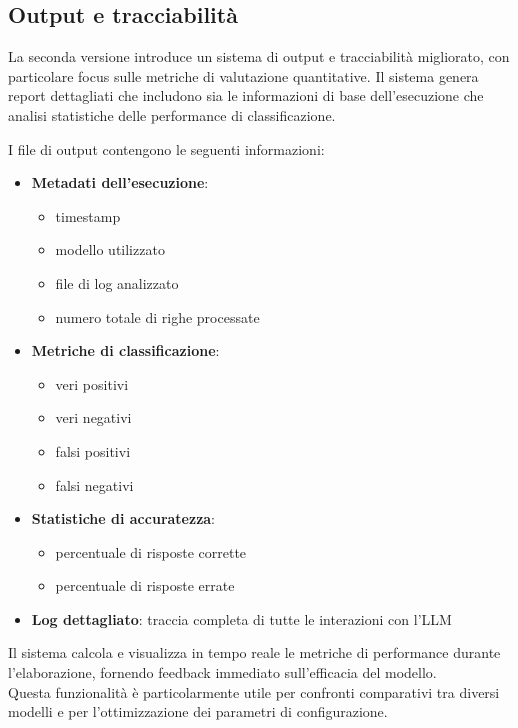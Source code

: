 \documentclass[12pt]{report}
\begin{document}
\subsection{Output e tracciabilità}
\label{subsec:ver2_output}

La seconda versione introduce un sistema di output e tracciabilità migliorato, con particolare focus sulle metriche di valutazione quantitative. Il sistema genera report dettagliati che includono sia le informazioni di base dell'esecuzione che analisi statistiche delle performance di classificazione.

I file di output contengono le seguenti informazioni:
\begin{itemize}
    \item \textbf{Metadati dell'esecuzione}:
          \begin{itemize}
              \item timestamp
              \item modello utilizzato
              \item file di log analizzato
              \item numero totale di righe processate
          \end{itemize}
    \item \textbf{Metriche di classificazione}:
          \begin{itemize}
              \item veri positivi
              \item veri negativi
              \item falsi positivi
              \item falsi negativi
          \end{itemize}
    \item \textbf{Statistiche di accuratezza}:
          \begin{itemize}
              \item percentuale di risposte corrette
              \item percentuale di risposte errate
          \end{itemize}
    \item \textbf{Log dettagliato}: traccia completa di tutte le interazioni con l'LLM
\end{itemize}

Il sistema calcola e visualizza in tempo reale le metriche di performance durante l'elaborazione, fornendo feedback immediato sull'efficacia del modello. \\
Questa funzionalità è particolarmente utile per confronti comparativi tra diversi modelli e per l'ottimizzazione dei parametri di configurazione.
\end{document}
